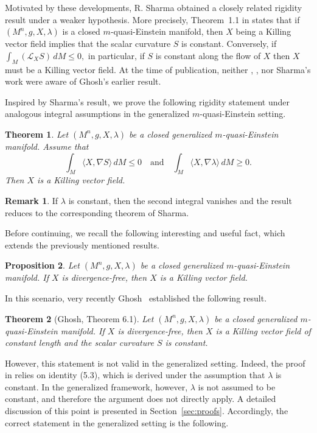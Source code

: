 \documentclass[a4paper, 12pt]{amsart}
\newtheorem{theorem}{Theorem}[]
\newtheorem{theo}{Theorem}
\newtheorem{prop}[theo]{Proposition}
\theoremstyle{definition}
\newtheorem{remark}[theorem]{Remark}
\numberwithin{figure}{section}
\begin{document}
Motivated by these developments, R. Sharma \cite{Rsharma2025} obtained a closely related rigidity result under a weaker hypothesis. More precisely, Theorem~1.1 in \cite{Rsharma2025} states that if $(M^n,g,X,\lambda)$ is a closed $m$-quasi-Einstein manifold, then $X$ being a Killing vector field implies that the scalar curvature $S$ is constant. Conversely, if
$ 
\int_M (\mathcal{L}_X S)\, dM\le 0,
$ in particular, if $S$ is constant along the flow of $X$ then $X$ must be a Killing vector field. At the time of publication, neither \cite{Cochran2025}, \cite{CostaFilho2024}, nor Sharma’s work were aware of Ghosh’s earlier result.


Inspired by Sharma’s result, we prove the following rigidity statement under analogous integral assumptions in the generalized $m$-quasi-Einstein setting.

\begin{theo}
Let $(M^n,g,X,\lambda)$ be a closed generalized $m$-quasi-Einstein manifold. Assume that
$$
\int_M \langle X,\nabla S\rangle\, dM \le 0
\quad \text{and} \quad
\int_M \langle X,\nabla \lambda\rangle\, dM \ge 0.
$$
Then $X$ is a Killing vector field.
\end{theo}

\begin{remark}
If $\lambda$ is constant, then the second integral vanishes and the result reduces to the corresponding theorem of Sharma.
\end{remark}

Before continuing, we recall the following interesting and useful fact, which extends the previously mentioned results.

\begin{prop}\label{prop-div}
    Let $ (M^n, g, X,\lambda)$ be a closed generalized $ m $-quasi-Einstein manifold. If $X$ is divergence-free, then $X$ is a Killing vector field.
\end{prop}

In this scenario, very recently Ghosh~\cite{ghosh} established the following result.

\begin{theorem}[Ghosh, Theorem 6.1]
Let $(M^n, g, X, \lambda)$ be a closed generalized $m$-quasi-Einstein manifold. If $X$ is divergence-free, then $X$ is a Killing vector field of constant length and the scalar curvature $S$ is constant.
\end{theorem}
However, this statement is not valid in the generalized setting. Indeed, the proof in \cite{ghosh} relies on identity (5.3), which is derived under the assumption that $\lambda$ is constant. In the generalized framework, however, $\lambda$ is not assumed to be constant, and therefore the argument does not directly apply. A detailed discussion of this point is presented in Section~\ref{sec:proofs}.
Accordingly, the correct statement in the generalized setting is the following.
\end{document}
